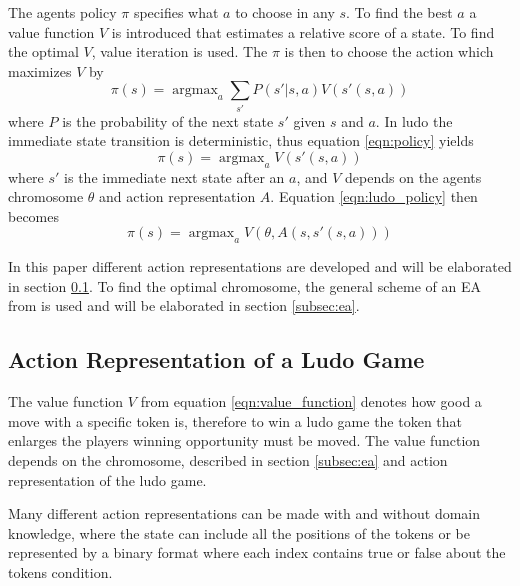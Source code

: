 \documentclass{llncs}
\DeclareMathOperator*{\argmax}{argmax}
\begin{document}
The agents policy $\pi$ specifies what $a$ to choose in any $s$. To find the best $a$ a value function $V$ is introduced that estimates a relative score of a state. To find the optimal $V$, value iteration is used. The $\pi$ is then to choose the action which maximizes $V$ by
\begin{equation}
\label{eqn:policy}
\pi(s) = \argmax_a \sum_{s'} P(s' | s,a) V(s'(s,a))
\end{equation}
where $P$ is the probability of the next state $s'$ given $s$ and $a$. In ludo the immediate state transition is deterministic, thus equation \ref{eqn:policy} yields
\begin{equation}
\label{eqn:ludo_policy}
\pi(s) = \argmax_a V (s'(s,a))
\end{equation}
where $s'$ is the immediate next state after an $a$, and $V$ depends on the agents chromosome $\theta$ and action representation $A$. Equation \ref{eqn:ludo_policy} then becomes
\begin{equation}
\label{eqn:value_function}
\pi(s) = \argmax_a V(\theta, A(s, s'(s,a)))
\end{equation}

In this paper different action representations are developed and will be elaborated in section \ref{subsec:action_representaion}. To find the optimal chromosome, the general scheme of an EA from \cite{ec:springer} is used and will be elaborated in section \ref{subsec:ea}.

\subsection{Action Representation of a Ludo Game} \label{subsec:action_representaion}
The value function $V$ from equation \ref{eqn:value_function} denotes how good a move with a specific token is, therefore to win a ludo game the token that enlarges the players winning opportunity must be moved. The value function depends on the chromosome, described in section \ref{subsec:ea} and action representation of the ludo game.

Many different action representations can be made with and without domain knowledge, where the state can include all the positions of the tokens or be represented by a binary format where each index contains true or false about the tokens condition.
\end{document}
